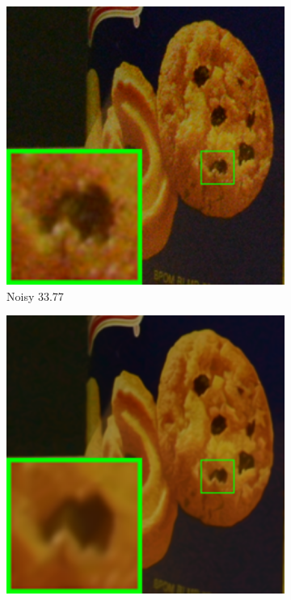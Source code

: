 \begin{figure}
    \centering
    \begin{subfigure}[t]{0.19\textwidth}
        \centering
        \includegraphics[width=1\textwidth]{images/guided/resize_br_Noisy_CC_Noisy_Nikon_D600_ISO_3200_C1_94b.png}
		\caption{Noisy 33.77}
    \end{subfigure}
    \hfill
    \begin{subfigure}[t]{0.19\textwidth}
        \centering
        \includegraphics[width=1\textwidth]{images/guided/resize_br_Offline_CC_Noisy_Nikon_D600_ISO_3200_C1_94b.png}

\end{subfigure}
\end{figure}
